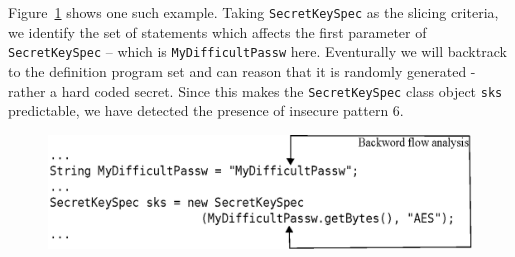 Figure~\ref{fig:slicing} shows one such example. Taking \texttt{SecretKeySpec} as the slicing criteria, we identify the set of statements which affects the first parameter of \texttt{SecretKeySpec} -- which is \texttt{MyDifficultPassw} here. Eventurally we will backtrack to the definition program set and can reason that it is randomly generated - rather a hard coded  secret. Since this makes the \texttt{SecretKeySpec} class object \texttt{sks} predictable, we have detected the presence of insecure pattern 6.

\begin{figure}[ht]
\includegraphics[width=\linewidth]{Figures/bckfwanalysis.eps}
\caption{}
\label{fig:slicing}
\end{figure}


